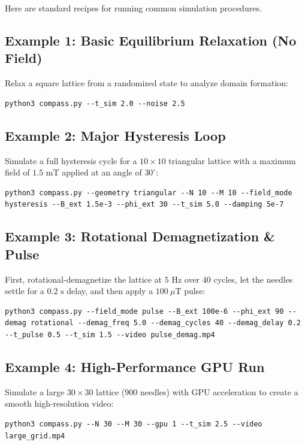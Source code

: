 \documentclass[11pt,a4paper]{article}
\begin{document}
Here are standard recipes for running common simulation procedures.

\subsection{Example 1: Basic Equilibrium Relaxation (No Field)}
Relax a square lattice from a randomized state to analyze domain formation:
\begin{lstlisting}
python3 compass.py --t_sim 2.0 --noise 2.5
\end{lstlisting}

\subsection{Example 2: Major Hysteresis Loop}
Simulate a full hysteresis cycle for a $10 \times 10$ triangular lattice with a maximum field of $1.5\text{ mT}$ applied at an angle of $30^{\circ}$:
\begin{lstlisting}
python3 compass.py --geometry triangular --N 10 --M 10 --field_mode hysteresis --B_ext 1.5e-3 --phi_ext 30 --t_sim 5.0 --damping 5e-7
\end{lstlisting}

\subsection{Example 3: Rotational Demagnetization \& Pulse}
First, rotational-demagnetize the lattice at $5\text{ Hz}$ over $40$ cycles, let the needles settle for a $0.2\text{ s}$ delay, and then apply a $100\ \mu\text{T}$ pulse:
\begin{lstlisting}
python3 compass.py --field_mode pulse --B_ext 100e-6 --phi_ext 90 --demag rotational --demag_freq 5.0 --demag_cycles 40 --demag_delay 0.2 --t_pulse 0.5 --t_sim 1.5 --video pulse_demag.mp4
\end{lstlisting}

\subsection{Example 4: High-Performance GPU Run}
Simulate a large $30 \times 30$ lattice (900 needles) with GPU acceleration to create a smooth high-resolution video:
\begin{lstlisting}
python3 compass.py --N 30 --M 30 --gpu 1 --t_sim 2.5 --video large_grid.mp4
\end{lstlisting}

\end{document}
